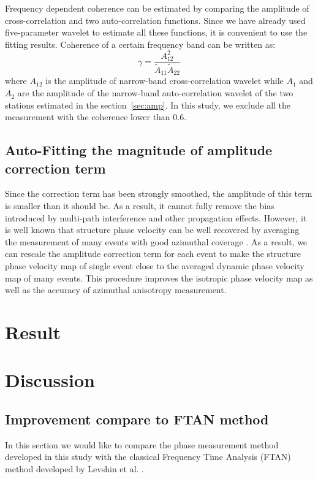 \documentclass{gji}
\begin{document}
Frequency dependent coherence can be estimated by comparing the amplitude of cross-correlation and two auto-correlation functions. Since we have already used five-parameter wavelet to estimate all these functions, it is convenient to use the fitting results. Coherence of a certain frequency band can be written as:
\[
\gamma = \frac{A_{12}^2}{\tilde{A}_{11}\tilde{A}_{22}}
\]
where $A_{12}$ is the amplitude of narrow-band cross-correlation wavelet while $A_{1}$  and $A_{2}$ are the amplitude of the narrow-band auto-correlation wavelet of the two stations estimated in the section~\ref{sec:amp}. In this study, we exclude all the measurement with the coherence lower than 0.6.

\subsection{Auto-Fitting the magnitude of amplitude correction term}

Since the correction term has been strongly smoothed, the amplitude of this term is smaller than it should be. As a result, it cannot fully remove the bias introduced by multi-path interference and other propagation effects. However, it is well known that structure phase velocity can be well recovered by averaging the measurement of many events with good azimuthal coverage \cite{Bodin:2008jk}. As a result, we can rescale the amplitude correction term for each event to make the structure phase velocity map of single event close to the averaged dynamic phase velocity map of many events. This procedure improves the isotropic phase velocity map as well as the accuracy of azimuthal anisotropy measurement.


\section{Result}

\section{Discussion}

\subsection{Improvement compare to FTAN method}

In this section we would like to compare the phase measurement method developed in this study with the classical Frequency Time Analysis (FTAN) method developed by Levshin et al. . 
\end{document}
